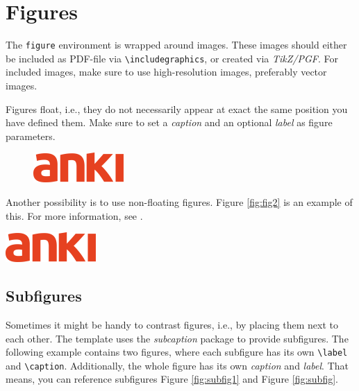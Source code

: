\section{Figures}

The \texttt{figure} environment is wrapped around images. These images should either be included as PDF-file via \texttt{\textbackslash includegraphics}, or created via \textit{TikZ/PGF}. For included images, make sure to use high-resolution images, preferably vector images.

Figures float, i.e., they do not necessarily appear at exact the same position you have defined them. Make sure to set a  \textit{caption} and an optional \textit{label} as figure parameters. 

\begin{figure}[label={fig:fig1}, caption={Anki Lab Logo}]
    \includegraphics[width=.6\textwidth]{figures/anki_logo.png} 
\end{figure}

Another possibility is to use non-floating figures. Figure \ref{fig:fig2} is an example of this. For more information, see \cite{forcefigureplacement}.

\begin{center}
    \includegraphics[width=.6\textwidth]{figures/anki_logo.png} 
    \label{fig:fig2}
\end{center}


\subsection{Subfigures}
Sometimes it might be handy to contrast figures, i.e., by placing them next to each other. The template uses the \textit{subcaption} package to provide subfigures. The following example contains two figures, where each subfigure has its own \texttt{\textbackslash label} and \texttt{\textbackslash caption}. Additionally, the whole figure has its own \textit{caption} and \textit{label}. That means, you can reference subfigures  Figure \ref{fig:subfig1} and Figure  \ref{fig:subfig}.

